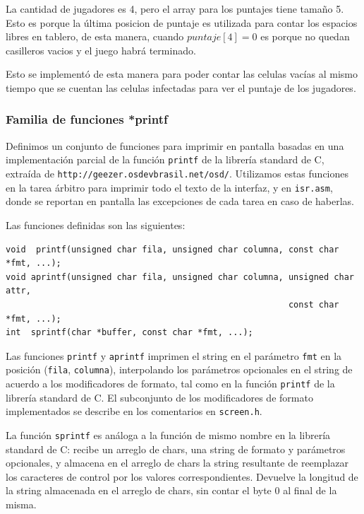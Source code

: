 \documentclass[a4paper,10pt,twoside]{article}
\begin{document}
La cantidad de jugadores es 4, pero el array para los puntajes tiene tamaño 5. Esto es porque la última posicion de puntaje es utilizada para contar los espacios libres en tablero, de esta manera, cuando $puntaje[4]= 0$ es porque no quedan casilleros vacios y el juego habrá terminado.

Esto se implementó de esta manera para poder contar las celulas vacías al mismo tiempo que se cuentan las celulas infectadas para ver el puntaje de los jugadores.


\subsubsection{Familia de funciones *printf}

Definimos un conjunto de funciones para imprimir en pantalla basadas en una implementación parcial de la función \texttt{printf} de la librería standard de C, extraída de \texttt{http://geezer.osdevbrasil.net/osd/}. Utilizamos estas funciones en la tarea árbitro para imprimir todo el texto de la interfaz, y en \texttt{isr.asm}, donde se reportan en pantalla las excepciones de cada tarea en caso de haberlas.

Las funciones definidas son las siguientes:

\begin{verbatim}
void  printf(unsigned char fila, unsigned char columna, const char *fmt, ...);
void aprintf(unsigned char fila, unsigned char columna, unsigned char attr,
                                                        const char *fmt, ...);
int  sprintf(char *buffer, const char *fmt, ...);
\end{verbatim}

Las funciones \texttt{printf} y \texttt{aprintf} imprimen el string en el parámetro \texttt{fmt} en la posición (\texttt{fila}, \texttt{columna}), interpolando los parámetros opcionales en el string de acuerdo a los modificadores de formato, tal como en la función \texttt{printf} de la librería standard de C. El subconjunto de los modificadores de formato implementados se describe en los comentarios en \texttt{screen.h}.

La función \texttt{sprintf} es análoga a la función de mismo nombre en la librería standard de C: recibe un arreglo de chars, una string de formato y parámetros opcionales, y almacena en el arreglo de chars la string resultante de reemplazar los caracteres de control por los valores correspondientes. Devuelve la longitud de la string almacenada en el arreglo de chars, sin contar el byte 0 al final de la misma.
\end{document}

